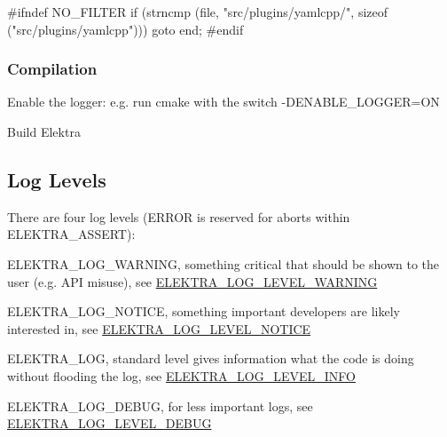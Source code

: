 \begin{DoxyCode}
\textcolor{preprocessor}{#ifndef NO\_FILTER}
     \textcolor{keywordflow}{if} (strncmp (file, \textcolor{stringliteral}{"src/plugins/yamlcpp/"}, \textcolor{keyword}{sizeof} (\textcolor{stringliteral}{"src/plugins/yamlcpp"}))) \textcolor{keywordflow}{goto} end;
\textcolor{preprocessor}{#endif}
\end{DoxyCode}


\subsubsection*{Compilation}


\begin{DoxyEnumerate}
\item Enable the logger\+: e.\+g. run {\ttfamily cmake} with the switch {\ttfamily -\/\+D\+E\+N\+A\+B\+L\+E\+\_\+\+L\+O\+G\+G\+ER=ON}
\item Build Elektra
\end{DoxyEnumerate}

\subsection*{Log Levels}

There are four log levels (E\+R\+R\+OR is reserved for aborts within {\ttfamily E\+L\+E\+K\+T\+R\+A\+\_\+\+A\+S\+S\+E\+RT})\+:


\begin{DoxyItemize}
\item E\+L\+E\+K\+T\+R\+A\+\_\+\+L\+O\+G\+\_\+\+W\+A\+R\+N\+I\+NG, something critical that should be shown to the user (e.\+g. A\+PI misuse), see \hyperlink{kdblogger_8h_a4096a2ccd61c6f5ad60e9015fd1bbb4ba0524fff5c46e0cf07287c473c46cc8e2}{E\+L\+E\+K\+T\+R\+A\+\_\+\+L\+O\+G\+\_\+\+L\+E\+V\+E\+L\+\_\+\+W\+A\+R\+N\+I\+NG}
\item E\+L\+E\+K\+T\+R\+A\+\_\+\+L\+O\+G\+\_\+\+N\+O\+T\+I\+CE, something important developers are likely interested in, see \hyperlink{kdblogger_8h_a4096a2ccd61c6f5ad60e9015fd1bbb4ba329fc1e04c797ab8e54a137b21f41baf}{E\+L\+E\+K\+T\+R\+A\+\_\+\+L\+O\+G\+\_\+\+L\+E\+V\+E\+L\+\_\+\+N\+O\+T\+I\+CE}
\item E\+L\+E\+K\+T\+R\+A\+\_\+\+L\+OG, standard level gives information what the code is doing without flooding the log, see \hyperlink{kdblogger_8h_a4096a2ccd61c6f5ad60e9015fd1bbb4ba01618746c91d9d1090f599f604b9b832}{E\+L\+E\+K\+T\+R\+A\+\_\+\+L\+O\+G\+\_\+\+L\+E\+V\+E\+L\+\_\+\+I\+N\+FO}
\item E\+L\+E\+K\+T\+R\+A\+\_\+\+L\+O\+G\+\_\+\+D\+E\+B\+UG, for less important logs, see \hyperlink{kdblogger_8h_a4096a2ccd61c6f5ad60e9015fd1bbb4ba24c7a4c44a8b99b978dc99806d083386}{E\+L\+E\+K\+T\+R\+A\+\_\+\+L\+O\+G\+\_\+\+L\+E\+V\+E\+L\+\_\+\+D\+E\+B\+UG} 
\end{DoxyItemize}